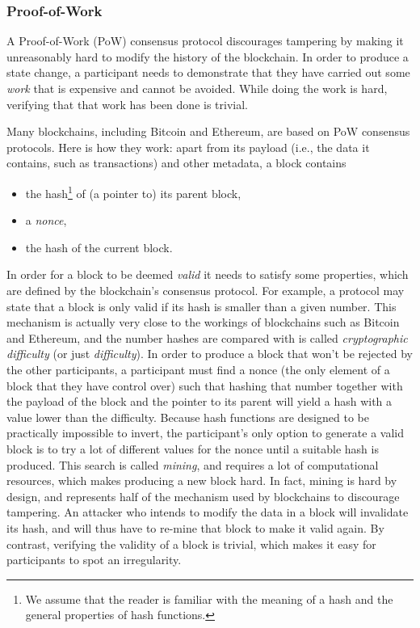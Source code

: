 \documentclass{article}
\begin{document}
\subsubsection{Proof-of-Work}

A Proof-of-Work (PoW) consensus protocol discourages tampering by making it
unreasonably hard to modify the history of the blockchain. In order to produce
a state change, a participant needs to demonstrate that they have carried out
some \emph{work} that is expensive and cannot be avoided. While doing the work
is hard, verifying that that work has been done is trivial.

Many blockchains, including Bitcoin and Ethereum, are based on PoW consensus
protocols.
Here is how they work: apart from its payload (i.e., the data it 
contains, such as transactions) and other metadata, a block contains

\begin{itemize}
  \item the hash\footnote{We assume that the reader is familiar with the
  meaning of a hash and the general properties of hash functions.} of (a
  pointer to) its parent block, 
  \item a \emph{nonce},
  \item the hash of the current block.
\end{itemize}

In order for a block to be deemed \emph{valid} it needs to satisfy some
properties, which are defined by the blockchain's consensus protocol.  For
example, a protocol may state that a block is only valid if its hash is smaller
than a given number. This mechanism is actually very close to the workings of
blockchains such as Bitcoin and Ethereum, and the number hashes are compared
with is called \emph{cryptographic difficulty} (or just \emph{difficulty}). In
order to produce a block that won't be rejected by the other participants, a
participant must find a nonce (the only element of a block that they have
control over) such that hashing that number together with the payload of the
block and the pointer to its parent will yield a hash with a value lower than
the difficulty. Because hash functions are designed to be practically
impossible to invert, the participant's only option to generate a valid block
is to try a lot of different values for the nonce until a suitable hash is
produced. This search is called \emph{mining}, and requires a lot of
computational resources, which makes producing a new block hard. In fact,
mining is hard by design, and represents half of the mechanism used by
blockchains to discourage tampering. An attacker who intends to modify the data
in a block will invalidate its hash, and will thus have to re-mine that block
to make it valid again. By contrast, verifying the validity of a block is
trivial, which makes it easy for participants to spot an irregularity.
\end{document}
